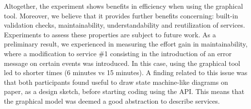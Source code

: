 Altogether, the experiment shows benefits in efficiency when using the graphical tool. Moreover, we believe that it provides further benefits 
concerning: built-in validation checks, maintainability, understandability and reutilization of services. Experiments to assess these properties are 
subject to future work. As a preliminary result, we experienced in measuring the effort gain in maintainability, where a modification to service \#1 
consisting in the introduction of an error message on certain events was introduced. In this case, using the graphical tool led to shorter times 
(6 minutes vs 15 minutes). A finding related to this issue was that both participants found useful to draw state machine-like diagrams on paper, 
as a design sketch, before starting coding using the API. This means that the graphical model was deemed a good abstraction to describe services.